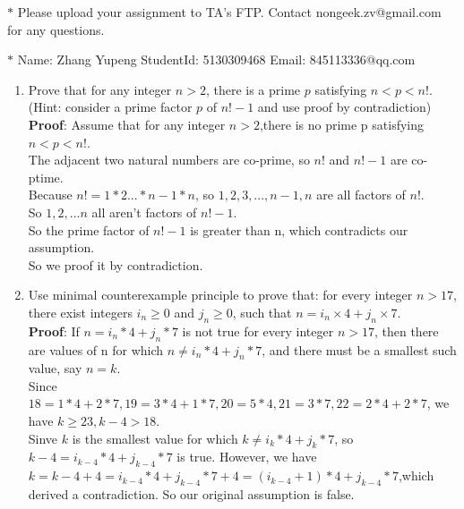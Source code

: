 \documentclass[12pt,a4paper]{article}
\theoremstyle{definition}
\numberwithin{equation}{section}
\numberwithin{figure}{section}
\begin{document}
\noindent

\noindent{}
\begin{center}
\footnotesize{\color{red}$*$ Please upload your assignment to TA's FTP. Contact nongeek.zv@gmail.com for any questions.}

\footnotesize{\color{blue}$*$ Name: Zhang Yupeng \quad StudentId: 5130309468 \quad Email: 845113336@qq.com}
\end{center}

\begin{enumerate}

\item Prove that for any integer $n>2$, there is a prime $p$ satisfying $n<p<n!$. {\color{blue}(Hint: consider a prime factor $p$ of $n!-1$ and use proof by contradiction)}
\\ \textbf{Proof}: Assume that for any integer $n>2$,there is no prime p satisfying $n<p<n!$.
\\ The adjacent two natural numbers are co-prime, so $n!$ and $n!-1$ are co-ptime.
\\ Because $n!=1*2...*n-1*n$, so $1,2,3,...,n-1,n$ are all factors of $n!$.
\\ So $1,2,...n$ all aren't factors of $n!-1$.
\\ So the prime factor of $n!-1$ is greater than n, which contradicts our assumption.
\\ So we proof it by contradiction.



\item Use minimal counterexample principle to prove that: for every integer $n>17$, there exist integers $i_n\ge 0$ and $j_n\ge 0$, such that $n = i_n \times 4 + j_n \times 7$.
\\
\textbf{Proof}: If $n=i_n*4+j_n*7$ is not true for every integer $n>17$, then there are values of n for which $n \neq i_n*4+j_n*7$, and there must be a smallest such value, say $n=k$. 
\\
Since $18=1*4+2*7, 19=3*4+1*7, 20=5*4,21=3*7,22=2*4+2*7$, we have $k \geq 23, k-4>18$.\\
Sinve $k$ is the smallest value for which $k \neq i_k*4+j_k*7$, so $k-4 = i_{k-4} *4+j_{k-4}*7$ is true.
However, we have $k=k-4+4=i_{k-4} *4+j_{k-4}*7+4=(i_{k-4}+1)*4+j_{k-4}*7$,which derived a contradiction. So our original assumption is false.


\end{enumerate}
\end{document}
